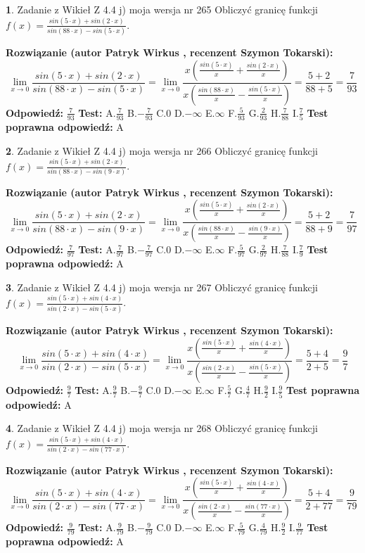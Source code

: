 \documentclass[12pt, a4paper]{article}
\theoremstyle{definition} %
\newtheorem{zad}{}
\newcommand{\zadStart}[1]{\begin{zad}#1\newline}
\newcommand{\zadStop}{\end{zad}}
\newcommand{\rozwStart}[2]{\noindent \textbf{Rozwiązanie (autor #1 , recenzent #2): }\newline}
\newcommand{\rozwStop}{\newline}
\newcommand{\odpStart}{\noindent \textbf{Odpowiedź:}\newline}
\newcommand{\odpStop}{\newline}
\newcommand{\testStart}{\noindent \textbf{Test:}\newline}
\newcommand{\testStop}{\newline}
\newcommand{\kluczStart}{\noindent \textbf{Test poprawna odpowiedź:}\newline}
\newcommand{\kluczStop}{\newline}
\begin{document}
\zadStart{Zadanie z Wikieł Z 4.4 j) moja wersja nr 265}
Obliczyć granicę funkcji $f(x)=\frac{sin(5\cdot x) +sin(2\cdot x)}{sin(88\cdot x) -sin(5\cdot x)}$.
\zadStop
\rozwStart{Patryk Wirkus}{Szymon Tokarski}
$$\lim\limits_{x\to 0}\frac{sin(5\cdot x) +sin(2\cdot x)}{sin(88\cdot x) -sin(5\cdot x)}=\lim\limits_{x\to 0}\frac{x(\frac{sin(5\cdot x)}{x}+\frac{sin(2\cdot x)}{x})}{x(\frac{sin(88\cdot x)}{x}-\frac{sin(5\cdot x)}{x})}=\frac{5+2}{88+5} = \frac{7}{93}$$
\rozwStop
\odpStart
$\frac{7}{93}$
\odpStop
\testStart
A.$\frac{7}{93}$
B.$-\frac{7}{93}$
C.$0$
D.$-\infty$
E.$\infty$
F.$\frac{5}{93}$
G.$\frac{2}{93}$
H.$\frac{7}{88}$
I.$\frac{7}{5}$
\testStop
\kluczStart
A
\kluczStop



\zadStart{Zadanie z Wikieł Z 4.4 j) moja wersja nr 266}
Obliczyć granicę funkcji $f(x)=\frac{sin(5\cdot x) +sin(2\cdot x)}{sin(88\cdot x) -sin(9\cdot x)}$.
\zadStop
\rozwStart{Patryk Wirkus}{Szymon Tokarski}
$$\lim\limits_{x\to 0}\frac{sin(5\cdot x) +sin(2\cdot x)}{sin(88\cdot x) -sin(9\cdot x)}=\lim\limits_{x\to 0}\frac{x(\frac{sin(5\cdot x)}{x}+\frac{sin(2\cdot x)}{x})}{x(\frac{sin(88\cdot x)}{x}-\frac{sin(9\cdot x)}{x})}=\frac{5+2}{88+9} = \frac{7}{97}$$
\rozwStop
\odpStart
$\frac{7}{97}$
\odpStop
\testStart
A.$\frac{7}{97}$
B.$-\frac{7}{97}$
C.$0$
D.$-\infty$
E.$\infty$
F.$\frac{5}{97}$
G.$\frac{2}{97}$
H.$\frac{7}{88}$
I.$\frac{7}{9}$
\testStop
\kluczStart
A
\kluczStop



\zadStart{Zadanie z Wikieł Z 4.4 j) moja wersja nr 267}
Obliczyć granicę funkcji $f(x)=\frac{sin(5\cdot x) +sin(4\cdot x)}{sin(2\cdot x) -sin(5\cdot x)}$.
\zadStop
\rozwStart{Patryk Wirkus}{Szymon Tokarski}
$$\lim\limits_{x\to 0}\frac{sin(5\cdot x) +sin(4\cdot x)}{sin(2\cdot x) -sin(5\cdot x)}=\lim\limits_{x\to 0}\frac{x(\frac{sin(5\cdot x)}{x}+\frac{sin(4\cdot x)}{x})}{x(\frac{sin(2\cdot x)}{x}-\frac{sin(5\cdot x)}{x})}=\frac{5+4}{2+5} = \frac{9}{7}$$
\rozwStop
\odpStart
$\frac{9}{7}$
\odpStop
\testStart
A.$\frac{9}{7}$
B.$-\frac{9}{7}$
C.$0$
D.$-\infty$
E.$\infty$
F.$\frac{5}{7}$
G.$\frac{4}{7}$
H.$\frac{9}{2}$
I.$\frac{9}{5}$
\testStop
\kluczStart
A
\kluczStop



\zadStart{Zadanie z Wikieł Z 4.4 j) moja wersja nr 268}
Obliczyć granicę funkcji $f(x)=\frac{sin(5\cdot x) +sin(4\cdot x)}{sin(2\cdot x) -sin(77\cdot x)}$.
\zadStop
\rozwStart{Patryk Wirkus}{Szymon Tokarski}
$$\lim\limits_{x\to 0}\frac{sin(5\cdot x) +sin(4\cdot x)}{sin(2\cdot x) -sin(77\cdot x)}=\lim\limits_{x\to 0}\frac{x(\frac{sin(5\cdot x)}{x}+\frac{sin(4\cdot x)}{x})}{x(\frac{sin(2\cdot x)}{x}-\frac{sin(77\cdot x)}{x})}=\frac{5+4}{2+77} = \frac{9}{79}$$
\rozwStop
\odpStart
$\frac{9}{79}$
\odpStop
\testStart
A.$\frac{9}{79}$
B.$-\frac{9}{79}$
C.$0$
D.$-\infty$
E.$\infty$
F.$\frac{5}{79}$
G.$\frac{4}{79}$
H.$\frac{9}{2}$
I.$\frac{9}{77}$
\testStop
\kluczStart
A
\kluczStop
\end{document}
